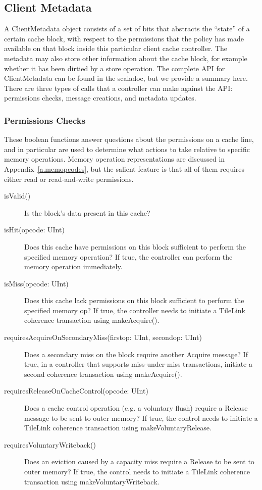 \subsection{Client Metadata} 

A ClientMetadata object consists of a set of bits that abstracts the “state” of a certain cache block,
with respect to the permissions that the policy has made available on that block inside this particular client cache controller.
The metadata may also store other information about the cache block,
for example whether it has been dirtied by a store operation.
The complete API for ClientMetadata can be found in the scaladoc, but we provide a summary here.
There are three types of calls that a controller can make against the API:
permissions checks, message creations, and metadata updates.

\subsubsection{Permissions Checks}

These boolean functions answer questions about the permissions on a cache line, and in particular are used to determine what actions to take relative to specific memory operations.
Memory operation representations are discussed in Appendix~\ref{a.memopcodes}, but the salient feature is that
all of them requires either read or read-and-write permissions.

\begin{description}
\item[isValid()]
Is the block's data present in this cache?
\item[isHit(opcode: UInt)]
Does this cache have permissions on this block sufficient to perform the specified memory operation?
If true, the controller can perform the memory operation immediately.
\item[isMiss(opcode: UInt)]
Does this cache lack permissions on this block sufficient to perform the specified memory op?
If true, the controller needs to initiate a TileLink coherence transaction using makeAcquire().
\item[requiresAcquireOnSecondaryMiss(firstop: UInt, secondop: UInt)]
Does a secondary miss on the block require another Acquire message?
If true, in a controller that supports miss-under-miss transactions, initiate a second coherence transaction using makeAcquire().
\item[requiresReleaseOnCacheControl(opcode: UInt)]
Does a cache control operation (e.g. a voluntary flush) require a Release message to be sent to outer memory?
If true, the control needs to initiate a TileLink coherence transaction using makeVoluntaryRelease.
\item[requiresVoluntaryWriteback()]
Does an eviction caused by a capacity miss require a Release to be sent to outer memory?
If true, the control needs to initiate a TileLink coherence transaction using makeVoluntaryWriteback.
\end{description}



